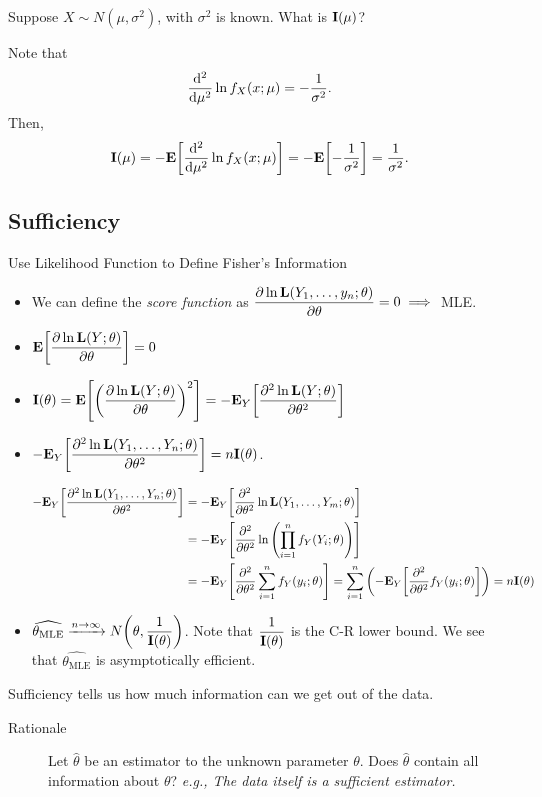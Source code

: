 \begin{eg}
	Suppose $X\sim N(\mu,\sigma^2)$, with $\sigma^2$ is known. What is $\vb{I}(\mu)$?
	\begin{sol}
		Note that \[\dv[2]{\mu}\ln f_X(x;\mu)=-\dfrac{1}{\sigma^2}.\] Then, \[\vb{I}(\mu)=-\vb{E}\qty[\dv[2]{\mu}\ln f_X(x;\mu)]=-\vb{E}\qty[-\dfrac{1}{\sigma^2}]=\dfrac{1}{\sigma^2}.\]
	\end{sol}
\end{eg}

\subsection{Sufficiency}
\begin{rmk} Use Likelihood Function to Define Fisher's Information
\begin{itemize}
	\item We can define the \emph{score function} as $\displaystyle\pdv{\ln \vb{L}\qty(Y_1,\dots,y_n;\theta)}{\theta}=0\implies$ MLE.
	\item $\vb{E}\qty[\displaystyle\pdv{\ln\vb{L}(Y;\theta)}{\theta}]=0$
	\item $\vb{I}(\theta)=\vb{E}\qty[\displaystyle\qty(\pdv{\ln\vb{L}(Y;\theta)}{\theta})^2]=-\vb{E}_Y\qty[\displaystyle\pdv[2]{\ln\vb{L}(Y;\theta)}{\theta}]$
	\item $-\vb{E}_Y\qty[\displaystyle\pdv[2]{\ln\vb{L}(Y_1,\dots,Y_n;\theta)}{\theta}]=n\vb{I}(\theta)$.
	\begin{prf}
		\begin{align*}
			-\vb{E}_Y\qty[\displaystyle\pdv[2]{\ln\vb{L}(Y_1,\dots,Y_n;\theta)}{\theta}]&=-\vb{E}_Y\qty[\pdv[2]{\theta}\ln\vb{L}\qty(Y_1,\dots,Y_m;\theta)]\\&=-\vb{E}_Y\qty[\pdv[2]{\theta}\ln\qty(\prod_{i=1}^nf_Y\qty(Y_i;\theta))]\\&=-\vb{E}_Y\qty[\pdv[2]{\theta}\sum_{i=1}^nf_Y\qty(y_i;\theta)]=\sum_{i=1}^n\qty(-\vb{E}_Y\qty[\pdv[2]{\theta}f_Y(y_i;\theta)])=n\vb{I}(\theta)
		\end{align*}
	\end{prf}
	\item $\widehat{\theta_\text{MLE}}\xrightarrow{n\to\infty}N\qty(\theta,\dfrac{1}{\vb{I}(\theta)})$. Note that $\dfrac{1}{\vb{I}(\theta)}$ is the C-R lower bound. We see that $\hat{\theta_\text{MLE}}$ is asymptotically efficient. 
\end{itemize}
\end{rmk}
\begin{rmk}
	Sufficiency tells us how much information can we get out of the data. 
	\begin{description}
		\item[Rationale] Let $\hat\theta$ be an estimator to the unknown parameter $\theta$. Does $\hat\theta$ contain all information about $\theta$? \emph{e.g., The data itself is a sufficient estimator. }
	\end{description}	
\end{rmk}
